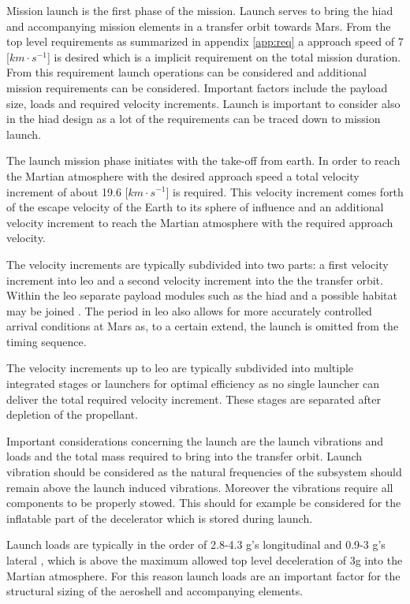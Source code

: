 Mission launch is the first phase of the mission. Launch serves to bring the \gls{hiad} and accompanying mission elements in a transfer orbit towards Mars. From the top level requirements as summarized in appendix \ref{app:req} a approach speed of 7 [$km\cdot s^{-1}$] is desired which is a implicit requirement on the total mission duration.
From this requirement launch operations can be considered and additional mission requirements can be considered. Important factors include the payload size, loads and required velocity increments. Launch is important to consider also in the \gls{hiad} design as a lot of the requirements can be traced down to mission launch.

The launch mission phase initiates with the take-off from earth. In order to reach the Martian atmosphere with the desired approach speed a total velocity increment of about 19.6 [$km\cdot s^{-1}$] is required. This velocity increment comes forth of the escape velocity of the Earth to its sphere of influence and an additional velocity increment to reach the Martian atmosphere with the required approach velocity.

The velocity increments are typically subdivided into two parts: a first velocity increment into \gls{leo} and a second velocity increment into the the transfer orbit. Within the \gls{leo} separate payload modules such as the \gls{hiad} and a possible habitat may be joined \cite{George2009}. The period in \gls{leo} also allows for more accurately controlled arrival conditions at Mars as, to a certain extend, the launch is omitted from the timing sequence. 

The velocity increments up to \gls{leo} are typically subdivided into multiple integrated stages or launchers for optimal efficiency as no single launcher can deliver the total required velocity increment. These stages are separated after depletion of the propellant.

Important considerations concerning the launch are the launch vibrations and loads and the total mass required to bring into the transfer orbit. Launch vibration should be considered as the natural frequencies of the subsystem should remain above the launch induced vibrations. Moreover the vibrations require all components to be properly stowed. This should for example be considered for the inflatable part of the decelerator which is stored during launch.

Launch loads are typically in the order of 2.8-4.3 g's longitudinal and 0.9-3 g's lateral \cite{Wertz2011}, which is above the maximum allowed top level deceleration of 3g into the Martian atmosphere. For this reason launch loads are an important factor for the structural sizing of the aeroshell and accompanying elements. 

